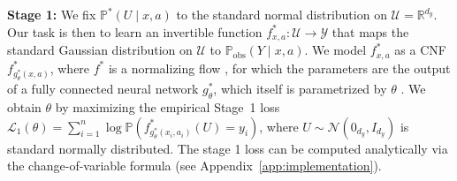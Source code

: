 \documentclass{article} %
\newcommand{\R}{\mathbb{R}}
\theoremstyle{definition}
\theoremstyle{plain}
\begin{document}
\textbf{Stage 1:} We fix $\mathbb{P}^\ast(U \mid x, a)$ to the standard normal distribution on $\mathcal{U} = \R^{d_y}$. Our task is then to learn an invertible function $f^\ast_{x, a} \colon \mathcal{U} \to \mathcal{Y}$ that maps the standard Gaussian distribution on $\mathcal{U}$ to $\mathbb{P}_\mathrm{obs}(Y \mid x, a)$. We model $f^\ast_{x, a}$ as a CNF $f^\ast_{g^\ast_\theta(x, a)}$, where $f^\ast$ is a normalizing flow \citep{Rezende.2015}, for which the parameters are the output of a fully connected neural network $g^\ast_\theta$, which itself is parametrized by $\theta$ \citep{Winkler.2019}. We obtain $\theta$ by maximizing the empirical Stage~1 loss    $\mathcal{L}_1(\theta) =  \sum_{i=1}^n \log \mathbb{P} ({f^\ast_{g^\ast_\theta(x_i, a_i)}}(U) = y_i)$, where $U \sim \mathcal{N}(0_{d_y}, I_{d_y})$ is standard normally distributed. The stage 1 loss can be computed analytically via the change-of-variable formula (see Appendix~\ref{app:implementation}).
\end{document}

